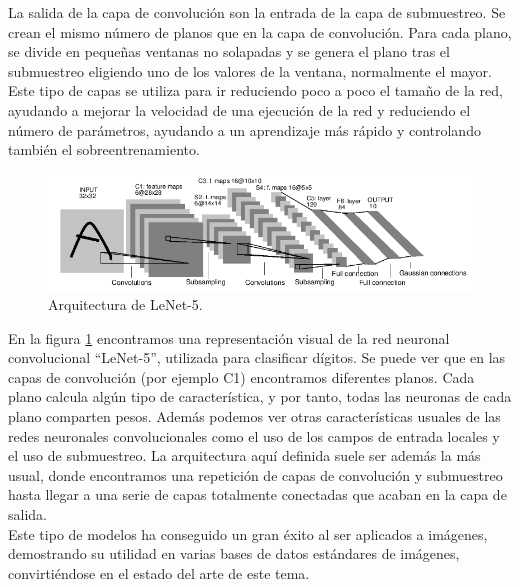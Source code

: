 La salida de la capa de convolución son la entrada de la capa de submuestreo. Se crean el mismo número de planos que en la capa de convolución. Para cada plano, se divide en pequeñas ventanas no solapadas y se genera el plano tras el submuestreo eligiendo uno de los valores de la ventana, normalmente el mayor. Este tipo de capas se utiliza para ir reduciendo poco a poco el tamaño de la red, ayudando a mejorar la velocidad de una ejecución de la red y reduciendo el número de parámetros, ayudando a un aprendizaje más rápido y controlando también el sobreentrenamiento.

\begin{figure}
\begin{center}

\includegraphics[scale=0.5]{img/lenet5.png}
\end{center}

\caption{Arquitectura de LeNet-5.}
\label{Lenet}
\end{figure}

En la figura \ref{Lenet} encontramos una representación visual de la red neuronal convolucional ``LeNet-5'', utilizada para clasificar dígitos. Se puede ver que en las capas de convolución (por ejemplo C1) encontramos diferentes planos. Cada plano calcula algún tipo de característica, y por tanto, todas las neuronas de cada plano comparten pesos. Además podemos ver otras características usuales de las redes neuronales convolucionales como el uso de los campos de entrada locales y el uso de submuestreo. La arquitectura aquí definida suele ser además la más usual, donde encontramos una repetición de capas de convolución y submuestreo hasta llegar a una serie de capas totalmente conectadas que acaban en la capa de salida.\\

Este tipo de modelos ha conseguido un gran éxito al ser aplicados a imágenes, demostrando su utilidad en varias bases de datos estándares de imágenes, convirtiéndose en el estado del arte de este tema.\\
